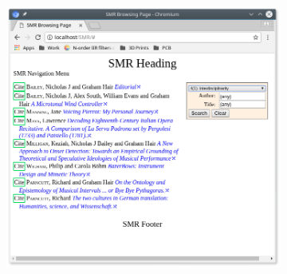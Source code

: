 \documentclass[a4paper,10pt]{SMR}
\begin{document}
\begin{figure}
 \begin{subfigure}[t]{0.6\textwidth}
  \includegraphics[width=\textwidth]{SMR_page-wide.png}
  \label{sf:wider}
 \end{subfigure}
 \begin{subfigure}[t]{0.3\textwidth}

\end{subfigure}
\end{figure}
\end{document}
